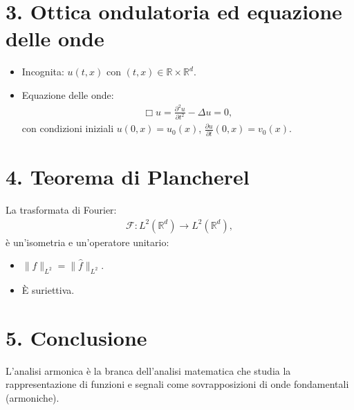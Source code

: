 \section*{3. Ottica ondulatoria ed equazione delle onde}
\begin{itemize}
    \item Incognita: $u(t, x)$ con $(t, x) \in \mathbb{R} \times \mathbb{R}^d$.
    \item Equazione delle onde:
    \begin{align*}
        \Box u = \frac{\partial^2 u}{\partial t^2} - \Delta u = 0,
    \end{align*}
    con condizioni iniziali $u(0, x) = u_0(x)$, $\frac{\partial u}{\partial t}(0, x) = v_0(x)$.
\end{itemize}

\section*{4. Teorema di Plancherel}
La trasformata di Fourier:
\begin{align*}
    \mathcal{F}: L^2(\mathbb{R}^d) \to L^2(\mathbb{R}^d),
\end{align*}
è un'isometria e un'operatore unitario:
\begin{itemize}
    \item $\|f\|_{L^2} = \|\hat{f}\|_{L^2}$.
    \item È suriettiva.
\end{itemize}

\section*{5. Conclusione}
L'analisi armonica è la branca dell'analisi matematica che studia la rappresentazione di funzioni e segnali come sovrapposizioni di onde fondamentali (armoniche).
